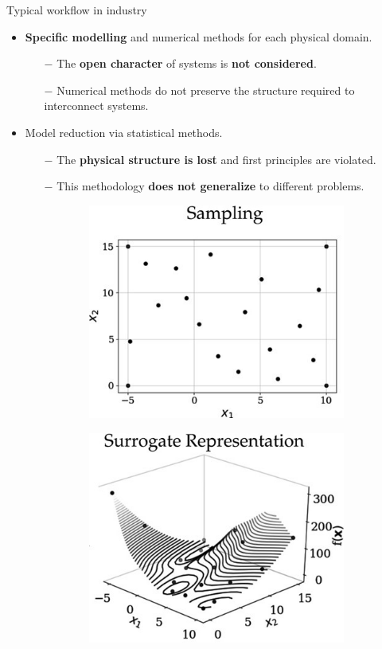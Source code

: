 \documentclass[aspectratio=169]{beamer}
\begin{document}
\begin{frame}{Typical workflow in industry}
	
	\begin{itemize}
		\item \textbf{Specific modelling} and numerical methods for each physical domain. 
			\begin{itemize}
			\item[$-$] The \textbf{open character} of systems is \textbf{not considered}.
			\item[$-$] Numerical methods do not preserve the structure required to interconnect systems.
		\end{itemize}
		\item Model reduction via statistical methods.
	\begin{itemize}
		\item[$-$] The \textbf{physical structure is lost} and first principles are violated.
		\item[$-$] This methodology \textbf{does not generalize} to different problems.
	\end{itemize}
\vspace{.3cm}
	\begin{figure}[t]
		\centering
		\begin{subfigure}[t]{0.4\textwidth}
			\includegraphics[width=.8\columnwidth]{sampling.jpg}
		\end{subfigure}\hspace{1cm}
		\begin{subfigure}[t]{0.4\textwidth}
			\includegraphics[width=.8\columnwidth]{surrogate_model.jpg}

\end{subfigure}
\end{figure}
\end{itemize}
\end{frame}
\end{document}
